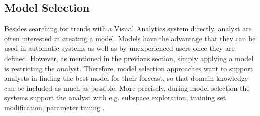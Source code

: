 \documentclass[electronic]{vgtc}             %
\begin{document}
\subsection{Model Selection\label{subsec:selection}}
Besides searching for trends with a Visual Analytics system directly, analyst are often interested in creating a model. 
Models have the advantage that they can be used in automatic systems as well as by unexperienced users once they are defined. 
However, as mentioned in the previous section, simply applying a model is restricting the analyst. 
Therefore, model selection approaches want to support analysts in finding the best model for their forecast, so that domain knowledge can be included as much as possible. 
More precisely, during model selection the systems support the analyst with e.g. subspace exploration, training set modification, parameter tuning \cite{Lu:2017}.
\end{document}
